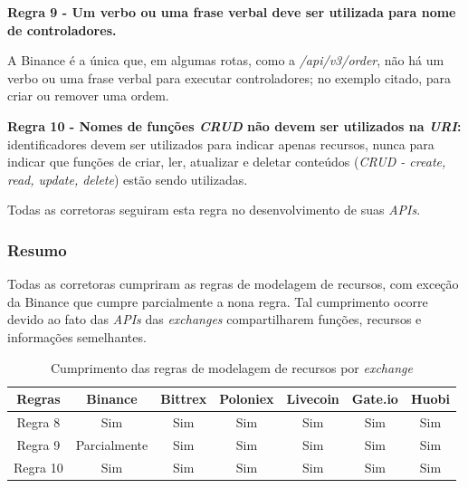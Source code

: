\textbf{Regra 9 - Um verbo ou uma frase verbal deve ser utilizada para nome de controladores.}

A Binance é a única que, em algumas rotas, como a \textit{/api/v3/order}, não há um verbo ou uma frase verbal para executar controladores; no exemplo citado, para criar ou remover uma ordem.

\textbf{Regra 10 - Nomes de funções \textit{CRUD} não devem ser utilizados na \textit{URI}:} identificadores devem ser utilizados para indicar apenas recursos, nunca para indicar que funções de criar, ler, atualizar e deletar conteúdos (\textit{CRUD - create, read, update, delete}) estão sendo utilizadas.

Todas as corretoras seguiram esta regra no desenvolvimento de suas \textit{APIs}.

\subsubsection{Resumo}

Todas as corretoras cumpriram as regras de modelagem de recursos, com exceção da Binance que cumpre parcialmente a nona regra. Tal cumprimento ocorre devido ao fato das \textit{APIs} das \textit{exchanges} compartilharem funções, recursos e informações semelhantes.

\begin{table}[h]
    \centering
    \begin{tabular}{|c|c|c|c|c|c|c|}
        \hline
        \textbf{Regras} & \textbf{Binance} & \textbf{Bittrex} & \textbf{Poloniex} & \textbf{Livecoin} & \textbf{Gate.io} & \textbf{Huobi} \\ \hline
        Regra 8         & Sim                & Sim                & Sim                 & Sim                 & Sim                & Sim              \\ \hline
        Regra 9         & Parcialmente       & Sim                & Sim                 & Sim                 & Sim                & Sim              \\ \hline
        Regra 10        & Sim                & Sim                & Sim                 & Sim                 & Sim                & Sim              \\ \hline
        
    \end{tabular}
    \caption{Cumprimento das regras de modelagem de recursos por \textit{exchange}}
    \label{tab:table-2}
\end{table}

